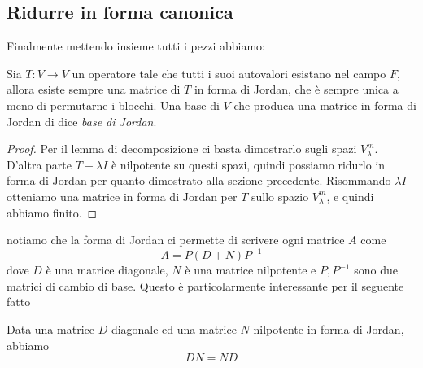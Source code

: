 \documentclass[11pt]{scrartcl}
\begin{document}
   	 \subsection{Ridurre in forma canonica}
   	 Finalmente mettendo insieme tutti i pezzi abbiamo:
   	 \begin{corollary}[Jordan]
   	 	Sia $T:V\to V$ un operatore tale che tutti i suoi autovalori esistano nel campo $F$, allora esiste sempre una matrice di $T$ in forma di Jordan, che è sempre unica a meno di permutarne i blocchi. Una base di $V$ che produca una matrice in forma di Jordan di dice \textit{base di Jordan}.
   	 \end{corollary}
   	 \begin{proof}
   	 	Per il lemma di decomposizione ci basta dimostrarlo sugli spazi $V_\lambda^m$. D'altra parte $T-\lambda I$ è nilpotente su questi spazi, quindi possiamo ridurlo in forma di Jordan per quanto dimostrato alla sezione precedente. Risommando $\lambda I$ otteniamo una matrice in forma di Jordan per $T$ sullo spazio $V_\lambda^m$, e quindi abbiamo finito.
   	 \end{proof}
   	 notiamo che la forma di Jordan ci permette di scrivere ogni matrice $A$ come
   	 $$A=P\left(D+N\right)P^{-1}$$
   	 dove $D$ è una matrice diagonale, $N$ è una matrice nilpotente e $P,P^{-1}$ sono due matrici di cambio di base. Questo è particolarmente interessante per il seguente fatto
   	 \begin{proposition}
   	 	Data una matrice $D$ diagonale ed una matrice $N$ nilpotente in forma di Jordan, abbiamo
   	 	$$DN=ND$$
   	 \end{proposition} 
\end{document}
